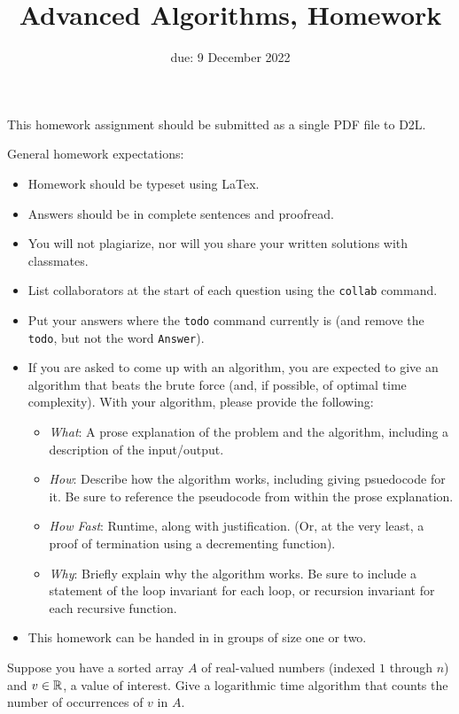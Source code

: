 \documentclass{article}
\title{Advanced Algorithms, Homework \hwnum}
\author{\todo{Your Name Here}}
\date{due: 9 December 2022}
\begin{document}
\maketitle

This homework assignment should be
submitted as a single PDF file to D2L.

General homework expectations:
\begin{itemize}
    \item Homework should be typeset using LaTex.
    \item Answers should be in complete sentences and proofread.
    \item You will not plagiarize, nor will you share your written solutions
        with classmates.
    \item List collaborators at the start of each question using the
        \texttt{collab} command.
    \item Put your answers where the \texttt{todo} command currently is (and
        remove the \texttt{todo}, but not the word \texttt{Answer}).
    \item If you are asked to come up with an algorithm, you are
        expected to give an algorithm that beats the brute force (and, if possible, of
        optimal time complexity). With your algorithm, please provide the following:
        \begin{itemize}
            \item \emph{What}: A prose explanation of the problem and the algorithm,
                including a description of the input/output.
            \item \emph{How}: Describe how the algorithm works, including giving
                psuedocode for it.  Be sure to reference the pseudocode
                from within the prose explanation.
            \item \emph{How Fast}: Runtime, along with justification.  (Or, at
                the very least, a proof of termination using a decrementing function).
           \item \emph{Why}: Briefly explain why the algorithm works.  Be sure
               to include a statement of the loop invariant for each loop, or
               recursion invariant for each recursive function.
        \end{itemize}
    \item This homework can be handed in in groups of size one or two.
\end{itemize}


\collab{\todo{}}
Suppose you have a sorted array $A$ of real-valued numbers (indexed $1$
through $n$) and
$v\in {\mathbb R}$, a value of interest.  Give
a logarithmic time algorithm that counts the number of occurrences of $v$
in $A$.
\end{document}
